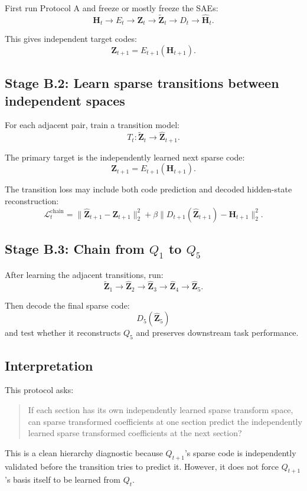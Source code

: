 \documentclass[11pt]{article}
\newcommand{\Htens}{\mathbf{H}}
\newcommand{\Ztens}{\mathbf{Z}}
\newcommand{\Hhat}{\widehat{\mathbf{H}}}
\newcommand{\Zhat}{\widehat{\mathbf{Z}}}
\newcommand{\Ztilde}{\widetilde{\mathbf{Z}}}
\begin{document}
First run Protocol A and freeze or mostly freeze the SAEs:
\[
\Htens_t
\rightarrow
E_t
\rightarrow
\Ztens_t
\rightarrow
\Ztilde_t
\rightarrow
D_t
\rightarrow
\Hhat_t.
\]

This gives independent target codes:
\[
\Ztens_{t+1}=E_{t+1}(\Htens_{t+1}).
\]

\subsection{Stage B.2: Learn sparse transitions between independent spaces}

For each adjacent pair, train a transition model:
\[
T_t:
\Ztilde_t
\rightarrow
\Zhat_{t+1}.
\]

The primary target is the independently learned next sparse code:
\[
\Ztens_{t+1}=E_{t+1}(\Htens_{t+1}).
\]

The transition loss may include both code prediction and decoded hidden-state reconstruction:
\[
\mathcal{L}^{\mathrm{chain}}_{t}
=
\|\Zhat_{t+1}-\Ztens_{t+1}\|_2^2
+
\beta
\|D_{t+1}(\Zhat_{t+1})-\Htens_{t+1}\|_2^2.
\]

\subsection{Stage B.3: Chain from \(Q_1\) to \(Q_5\)}

After learning the adjacent transitions, run:
\[
\Ztilde_1
\rightarrow
\Zhat_2
\rightarrow
\Zhat_3
\rightarrow
\Zhat_4
\rightarrow
\Zhat_5.
\]

Then decode the final sparse code:
\[
D_5(\Zhat_5)
\]
and test whether it reconstructs \(Q_5\) and preserves downstream task performance.

\subsection{Interpretation}

This protocol asks:
\begin{quote}
If each section has its own independently learned sparse transform space, can sparse transformed coefficients at one section predict the independently learned sparse transformed coefficients at the next section?
\end{quote}

This is a clean hierarchy diagnostic because \(Q_{t+1}\)'s sparse code is independently validated before the transition tries to predict it. However, it does not force \(Q_{t+1}\)'s basis itself to be learned from \(Q_t\).
\end{document}

